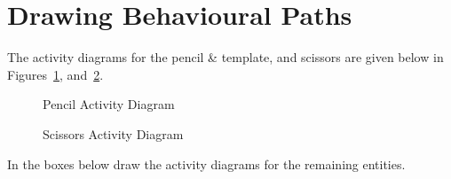 \documentclass[
  10pt,
  a4paperpaper,
  DIV=11,
  numbers=noendperiod,
  oneside]{scrreprt}
\begin{document}
\newpage{}

\section{Drawing Behavioural Paths}\label{drawing-behavioural-paths-1}

The activity diagrams for the pencil \& template, and scissors are given
below in Figures~\ref{fig-pencil_act}, and~\ref{fig-scissors_act}.

\begin{figure}[htbp]


\caption{\label{fig-pencil_act}Pencil Activity Diagram}

\end{figure}%

\begin{figure}[htbp]


\caption{\label{fig-scissors_act}Scissors Activity Diagram}

\end{figure}%

\newpage{}

In the boxes below draw the activity diagrams for the remaining
entities.
\end{document}
